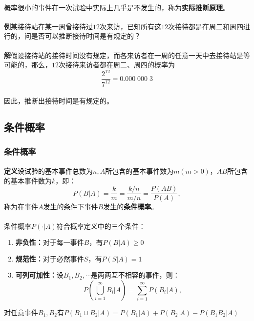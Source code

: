 \paragraph{}
概率很小的事件在一次试验中实际上几乎是不发生的，称为\textbf{实际推断原理}。
\paragraph{}
\textbf{例\;}某接待站在某一周曾接待过$12$次来访，已知所有这$12$次接待都是在周二和周四进行的，问是否可以推断接待时间是有规定的？
\paragraph{}
\textbf{解\;}假设接待站的接待时间没有规定，而各来访者在一周的任意一天中去接待站是等可能的，那么，$12$次接待来访者都在周二、周四的概率为
\begin{equation*}
  \frac{2^{12}}{7^{12}} = 0.000 \; 000 \; 3
\end{equation*}
\paragraph{}
因此，推断出接待时间是有规定的。

\subsection{条件概率}
\subsubsection{条件概率}
\paragraph{}
\label{条件概率定义}
\textbf{定义\;}设试验的基本事件总数为$n, A$所包含的基本事件数为$m(m>0)$，$AB$所包含的基本事件数为$k$，即：
\begin{equation}
  P(B|A) = \frac{k}{m} = \frac{k/n}{m/n} = \frac{P(AB)}{P(A)},
\end{equation}
称为在事件$A$发生的条件下事件$B$发生的\textbf{条件概率}。
\paragraph{}
条件概率$P(\cdot | A)$符合概率定义中的三个条件：
\begin{enumerate}
  \item \textbf{非负性：}对于每一事件$B$，有$P(B|A)\geq 0$
  \item \textbf{规范性：}对于必然事件$S$，有$P(S|A)=1$
  \item \textbf{可列可加性：}设$B_1, B_2, \cdots$是两两互不相容的事件，则：
  \begin{equation}
    P(\bigcup_{i=1}^\infty B_i | A) = \sum_{i=1}^\infty P(B_i | A),
  \end{equation}
\end{enumerate}
对任意事件$B_1, B_2$有$P(B_1 \cup B_2 | A) = P(B_1 | A) + P(B_2 | A) - P(B_1B_2|A)$

